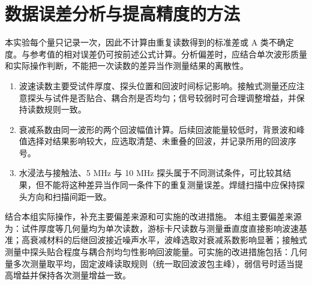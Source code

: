 \documentclass[UTF8,a4paper,12pt]{ctexart}
\numberwithin{equation}{section}
\begin{document}
\section{数据误差分析与提高精度的方法}
本实验每个量只记录一次，因此不计算由重复读数得到的标准差或 A 类不确定度。与参考值的相对误差仍可按前述公式计算。分析偏差时，应结合单次波形质量和实际操作判断，不能把一次读数的差异当作测量结果的离散性。
\begin{enumerate}
  \item 波速读数主要受试件厚度、探头位置和回波时间标记影响。接触式测量还应注意探头与试件是否贴合、耦合剂是否均匀；信号较弱时可合理调整增益，并保持读数规则一致。
  \item 衰减系数由同一波形的两个回波幅值计算。后续回波能量较低时，背景波和峰值选择对结果影响较大，应选取清楚、未重叠的回波，并记录所用的回波序号。
  \item 水浸法与接触法、5 MHz 与 10 MHz 探头属于不同测试条件，可比较其结果，但不能将这种差异当作同一条件下的重复测量误差。焊缝扫描中应保持探头方向和扫描间距一致。
\end{enumerate}
结合本组实际操作，补充主要偏差来源和可实施的改进措施。
本组主要偏差来源为：试件厚度等几何量均为单次读数，游标卡尺读数与测量垂直度直接影响波速基准；高衰减材料的后继回波接近噪声水平，波峰选取对衰减系数影响显著；接触式测量中探头贴合程度与耦合剂均匀性影响回波能量。可实施的改进措施包括：几何量多次测量取平均，固定波峰读取规则（统一取回波波包主峰），弱信号时适当提高增益并保持各次测量增益一致。
\end{document}
